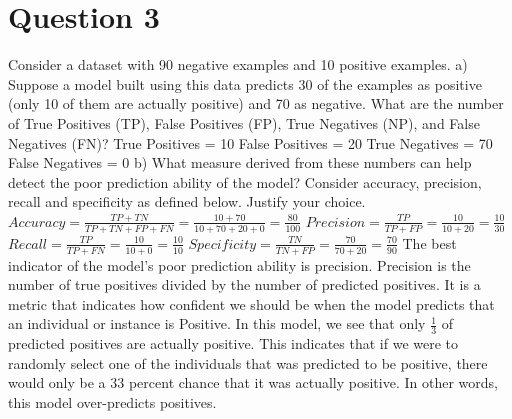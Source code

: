 \documentclass{article}
\begin{document}
    \section*{Question 3}
    Consider a dataset with 90 negative examples and 10 positive examples.
    \newline
    a) Suppose a model built using this data predicts 30 of the examples as positive (only 10 of them are actually positive) and 70 as negative. What are the number of True Positives (TP), False Positives (FP), True Negatives (NP), and False Negatives (FN)?
    \newline
    True Positives = 10
    \newline
    False Positives = 20
    \newline
    True Negatives = 70
    \newline
    False Negatives = 0
    \newline
    b) What measure derived from these numbers can help detect the poor prediction ability of the model? Consider accuracy, precision, recall and specificity as defined below. Justify your choice.
    \newline
    $Accuracy = \frac{TP + TN}{TP + TN + FP + FN} = \frac{10 + 70}{10 + 70 + 20 + 0} = \frac{80}{100}$
    \newline
    $Precision = \frac{TP}{TP + FP} = \frac{10}{10 + 20} = \frac{10}{30}$
    \newline
    $Recall = \frac{TP}{TP + FN} = \frac{10}{10 + 0} = \frac{10}{10}$
    \newline
    $Specificity = \frac{TN}{TN + FP} = \frac{70}{70 + 20} = \frac{70}{90}$
    \newline
    \newline
    The best indicator of the model's poor prediction ability is precision. Precision is the number of true positives divided by the number of predicted positives. It is a metric that indicates how confident we should be when the model predicts that an individual or instance is Positive.
    \newline
    In this model, we see that only $\frac{1}{3}$ of predicted positives are actually positive. This indicates that if we were to randomly select one of the individuals that was predicted to be positive, there would only be a 33 percent chance that it was actually positive. In other words, this model over-predicts positives.
    
\end{document}
